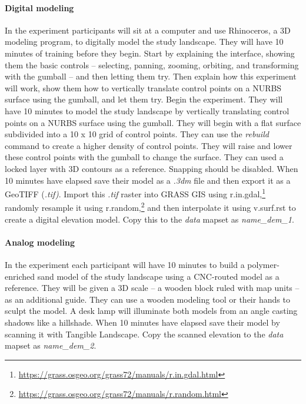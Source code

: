 \documentclass[prodmode,acmtochi]{acmsmall} %
\begin{document}
\paragraph{Digital modeling}
In the  experiment participants will sit at a computer
and use Rhinoceros, a 3D modeling program, to digitally model
the study landscape. 
They will have 10 minutes of training before they begin.
Start by explaining the interface, 
showing them the basic controls 
-- selecting, panning, zooming, orbiting, and transforming with the gumball --
and then letting them try.
Then explain how this experiment will work, 
show them how to vertically translate control points on a NURBS surface
using the gumball, 
and let them try. 
Begin the experiment. 
They will have 10 minutes to model the study landscape
by vertically translating control points on a NURBS surface
using the gumball.
They will begin with a flat surface 
subdivided into a 10 x 10 grid of control points.
They can use the \emph{rebuild} command 
to create a higher density of control points.
They will raise and lower these control points with the gumball
to change the surface. 
They can used a locked layer with 3D contours as a reference.
Snapping should be disabled.  
%
When 10 minutes have elapsed 
save their model as a \emph{.3dm} file
and then export it as a GeoTIFF (\emph{.tif)}. 
Import this \emph{.tif} raster into GRASS GIS
using r.in.gdal,\footnote{
\url{https://grass.osgeo.org/grass72/manuals/r.in.gdal.html}}
randomly resample it using r.random,\footnote{
\url{https://grass.osgeo.org/grass72/manuals/r.random.html}}
and then interpolate it using v.surf.rst 
to create a digital elevation model.
Copy this to the \emph{data} mapset
as \emph{name{\_}dem{\_}1}.

\paragraph{Analog modeling}
In the  experiment
each participant will have 10 minutes to build a polymer-enriched sand model
of the study landscape using a CNC-routed model as a reference. 
They will be given a 3D scale 
-- a wooden block ruled with map units -- 
as an additional guide. 
They can use a wooden modeling tool or their hands to sculpt the model.  
A desk lamp will illuminate both models from an angle
casting shadows like a hillshade. 
%
When 10 minutes have elapsed 
save their model by scanning it with Tangible Landscape.
Copy the scanned elevation to the \emph{data} mapset
as \emph{name{\_}dem{\_}2}.
\end{document}
